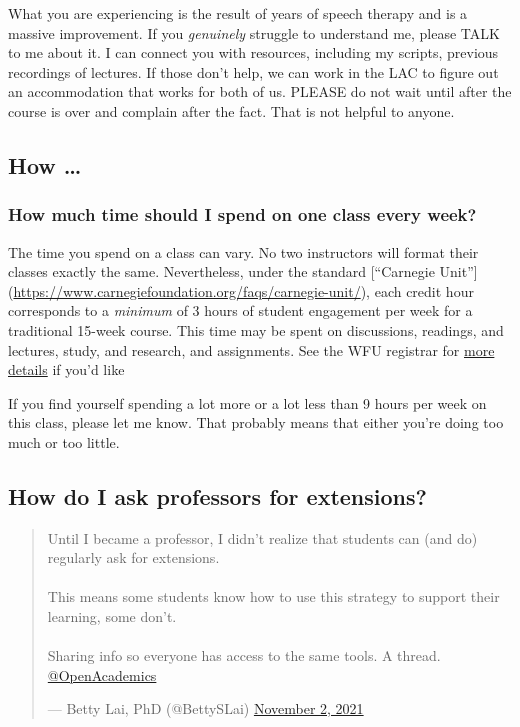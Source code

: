 What you are experiencing is the result of years of speech therapy and is a massive improvement. If you \emph{genuinely} struggle to understand me, please TALK to me about it. I can connect you with resources, including my scripts, previous recordings of lectures. If those don't help, we can work in the LAC to figure out an accommodation that works for both of us. PLEASE do not wait until after the course is over and complain after the fact. That is not helpful to anyone.

\hypertarget{how}{%
\subsection{How \ldots{}}\label{how}}

\hypertarget{how-much-time-should-i-spend-on-one-class-every-week}{%
\subsubsection{How much time should I spend on one class every week?}\label{how-much-time-should-i-spend-on-one-class-every-week}}

The time you spend on a class can vary. No two instructors will format their classes exactly the same. Nevertheless, under the standard {[}``Carnegie Unit''{]} (\url{https://www.carnegiefoundation.org/faqs/carnegie-unit/}), each credit hour corresponds to a \emph{minimum} of 3 hours of student engagement per week for a traditional 15-week course. This time may be spent on discussions, readings, and lectures, study, and research, and assignments. See the WFU registrar for \href{https://registrar.wfu.edu/semester-credit-hour/}{more details} if you'd like

If you find yourself spending a lot more or a lot less than 9 hours per week on this class, please let me know. That probably means that either you're doing too much or too little.

\hypertarget{how-do-i-ask-professors-for-extensions}{%
\subsection{How do I ask professors for extensions?}\label{how-do-i-ask-professors-for-extensions}}

\begin{quote}
Until I became a professor, I didn't realize that students can (and
do) regularly ask for extensions.\\
~\\
This means some students know how to use this strategy to support
their learning, some don't.\\
~\\
Sharing info so everyone has access to the same tools. A thread.
\href{https://twitter.com/OpenAcademics}{@OpenAcademics}

\begin{flushright}--- Betty Lai, PhD (@BettySLai) \href{https://twitter.com/BettySLai/status/1455555111397117954}{November 2,
2021}\end{flushright}
\end{quote}

